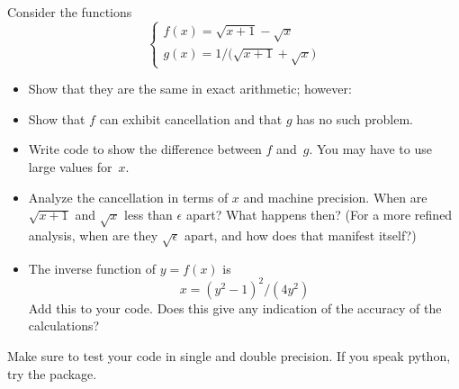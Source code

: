 \begin{exercise}
  Consider the functions
  \begin{equation}
  \begin{cases}
    f(x) = \sqrt{x+1}-\sqrt{x}\\
    g(x) = 1/\bigl(\sqrt{x+1}+\sqrt{x}\bigr)
  \end{cases}
  \end{equation}
  \begin{itemize}
  \item Show that they are the same in exact arithmetic; however:
  \item Show that $f$ can exhibit cancellation and that $g$ has no such problem.
  \item Write code to show the difference between $f$ and~$g$. You may
    have to use large values for~$x$.
  \item Analyze the cancellation in terms of $x$ and machine
    precision.  When are $\sqrt{x+1}$ and $\sqrt{x}$ less than
    $\epsilon$ apart?  What happens then? (For a more refined
    analysis, when are they $\sqrt\epsilon$ apart, and how does that
    manifest itself?)
  \item The inverse function of $y=f(x)$ is
    \begin{equation}
      x = (y^2-1)^2 / (4y^2)
    \end{equation}
    Add this to your code. Does this give any indication of the
    accuracy of the calculations?
  \end{itemize}
  Make sure to test your code in single and double precision.
  If you speak python, try the  package.
\end{exercise}



